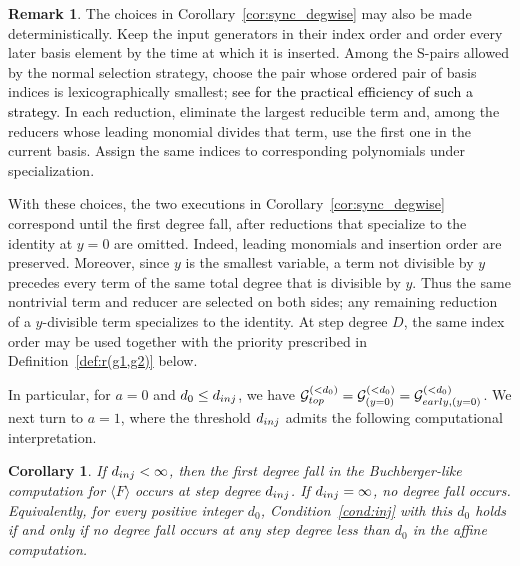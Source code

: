 \documentclass{article}
\newtheorem{corollary}[theorem]{Corollary}
\theoremstyle{definition}
\newtheorem{remark}[theorem]{Remark}
\theoremstyle{plain}
\theoremstyle{plain}
\theoremstyle{plain}
\theoremstyle{plain}
\numberwithin{equation}{subsection}
\begin{document}
\begin{remark}\label{rem:deterministic}
The choices in Corollary~\ref{cor:sync_degwise} may also be made deterministically.
Keep the input generators in their index order and order every later basis element by the time at which it is inserted.
Among the S-pairs allowed by the normal selection strategy, choose the pair whose ordered pair of basis indices is lexicographically smallest;
\textcolor{black}{see \cite{sugar} for the practical efficiency of such a strategy}.
In each reduction, eliminate the largest reducible term and, among the reducers whose leading monomial divides that term, use the first one in the current basis.
Assign the same indices to corresponding polynomials under specialization.

With these choices, the two executions in Corollary~\ref{cor:sync_degwise} correspond until the first degree fall, after reductions that specialize to the identity at $y=0$ are omitted.
Indeed, leading monomials and insertion order are preserved.
Moreover, since $y$ is the smallest variable, a term not divisible by $y$ precedes every term of the same total degree that is divisible by $y$.
Thus the same nontrivial term and reducer are selected on both sides;
any remaining reduction of a $y$-divisible term specializes to the identity.
At step degree $D$, the same index order may be used together with the priority prescribed in Definition~\ref{def:r(g1,g2)} below.
\end{remark}

In particular, for $a=0$ and $d_0\le d_{\rm inj}$, we have $\mathcal G_{\rm top}^{(<d_0)} =\mathcal G_{(y=0)}^{(<d_0)} =\mathcal G_{\rm early,(y=0)}^{(<d_0)}$.
We next turn to $a=1$, where the threshold $d_{\rm inj}$ admits the following computational interpretation.

\begin{corollary}\label{cor:dinj-fall}
If $d_{\rm inj}<\infty$, then the first degree fall in the Buchberger-like computation for $\langle F\rangle$ occurs at step degree $d_{\rm inj}$.
If $d_{\rm inj}=\infty$, no degree fall occurs.
Equivalently, for every positive integer $d_0$, Condition~\ref{cond:inj} with this $d_0$ holds if and only if no degree fall occurs at any step degree less than $d_0$ in the affine computation.
\end{corollary}
\end{document}
